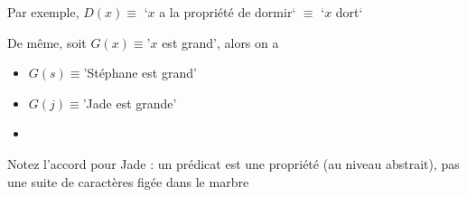 \begin{frame}
	
 Par exemple, $D(x) \equiv $ `$x$ a la propriété de dormir` $\equiv$ `$x$ dort`
	 

	
	\pause\pause
	
	De même, soit $G(x) \equiv $'$x$ est grand', alors on a \newline
	
	 \begin{itemize}
	 \item $G(s) \equiv $'Stéphane est grand' 
	\item $G(j) \equiv $'Jade est grande' 
	\item \textcolor{white}{lol}
	\end{itemize}
	
	\pause
	
	Notez l'accord pour Jade : un prédicat est une propriété (au niveau abstrait), pas une suite de caractères figée dans le marbre
	
	

\end{frame}

